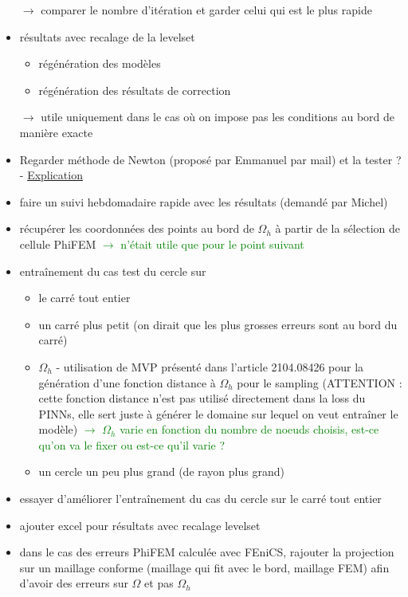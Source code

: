 \begin{itemize}[label=$\square$]
	$\rightarrow$ comparer le nombre d'itération et garder celui qui est le plus rapide
	\item[\done] résultats avec recalage de la levelset
	\begin{itemize}[label=\LARGE $\circ$]
		\item[\sdone] régénération des modèles 
		\item[\sdone] régénération des résultats de correction
	\end{itemize}
	$\rightarrow$ utile uniquement dans le cas où on impose pas les conditions au bord de manière exacte
	\item Regarder méthode de Newton (proposé par Emmanuel par mail) et la tester ? - \href{https://www.mathweb.fr/euclide/methode-de-newton/}{Explication}
	\item[\done] faire un suivi hebdomadaire rapide avec les résultats (demandé par Michel)
	\item[\wontfix] récupérer les coordonnées des points au bord de $\Omega_h$ à partir de la sélection de cellule PhiFEM \textcolor{Green}{$\rightarrow$ n'était utile que pour le point suivant}
	\item entraînement du cas test du cercle sur 
	\begin{itemize}[label=\LARGE $\circ$]
		\item[\sdone] le carré tout entier
		\item un carré plus petit (on dirait que les plus grosses erreurs sont au bord du carré)
		\item[\swontfix] $\Omega_h$ - utilisation de MVP présenté dans l'article 2104.08426 pour la génération d'une fonction distance à $\Omega_h$ pour le sampling (ATTENTION : cette fonction distance n'est pas utilisé directement dans la loss du PINNs, elle sert juste à générer le domaine sur lequel on veut entraîner le modèle) \textcolor{Green}{$\rightarrow$ $\Omega_h$ varie en fonction du nombre de noeuds choisis, est-ce qu'on va le fixer ou est-ce qu'il varie ?}
		\item un cercle un peu plus grand (de rayon plus grand) 
	\end{itemize}
	\item essayer d'améliorer l'entraînement du cas du cercle sur le carré tout entier
	\item[\wontfix] ajouter excel pour résultats avec recalage levelset
	\item[\done] dans le cas des erreurs PhiFEM calculée avec FEniCS, rajouter la projection sur un maillage conforme (maillage qui fit avec le bord, maillage FEM) afin d'avoir des erreurs sur $\Omega$ et pas $\Omega_h$

\end{itemize}
